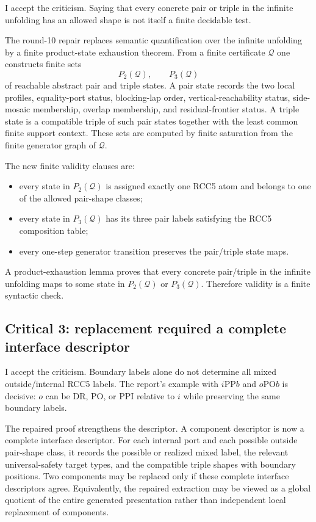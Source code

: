 \documentclass[11pt]{article}
\newcommand{\PP}{\mathrm{PP}}
\newcommand{\PPI}{\mathrm{PPI}}
\newcommand{\DR}{\mathrm{DR}}
\newcommand{\PO}{\mathrm{PO}}
\newcommand{\Q}{\mathcal Q}
\begin{document}
I accept the criticism.  Saying that every concrete pair or triple in the infinite unfolding has an allowed shape is not itself a finite decidable test.

The round-10 repair replaces semantic quantification over the infinite unfolding by a finite product-state exhaustion theorem.  From a finite certificate $\Q$ one constructs finite sets
\[
   P_2(\Q),\qquad P_3(\Q)
\]
of reachable abstract pair and triple states.  A pair state records the two local profiles, equality-port status, blocking-lap order, vertical-reachability status, side-mosaic membership, overlap membership, and residual-frontier status.  A triple state is a compatible triple of such pair states together with the least common finite support context.  These sets are computed by finite saturation from the finite generator graph of $\Q$.

The new finite validity clauses are:
\begin{itemize}
\item every state in $P_2(\Q)$ is assigned exactly one RCC5 atom and belongs to one of the allowed pair-shape classes;
\item every state in $P_3(\Q)$ has its three pair labels satisfying the RCC5 composition table;
\item every one-step generator transition preserves the pair/triple state maps.
\end{itemize}
A product-exhaustion lemma proves that every concrete pair/triple in the infinite unfolding maps to some state in $P_2(\Q)$ or $P_3(\Q)$.  Therefore validity is a finite syntactic check.

\subsection{Critical 3: replacement required a complete interface descriptor}

I accept the criticism.  Boundary labels alone do not determine all mixed outside/internal RCC5 labels.  The report's example with $i\PP b$ and $o\PO b$ is decisive: $o$ can be $\DR$, $\PO$, or $\PPI$ relative to $i$ while preserving the same boundary labels.

The repaired proof strengthens the descriptor.  A component descriptor is now a complete interface descriptor.  For each internal port and each possible outside pair-shape class, it records the possible or realized mixed label, the relevant universal-safety target types, and the compatible triple shapes with boundary positions.  Two components may be replaced only if these complete interface descriptors agree.  Equivalently, the repaired extraction may be viewed as a global quotient of the entire generated presentation rather than independent local replacement of components.
\end{document}
